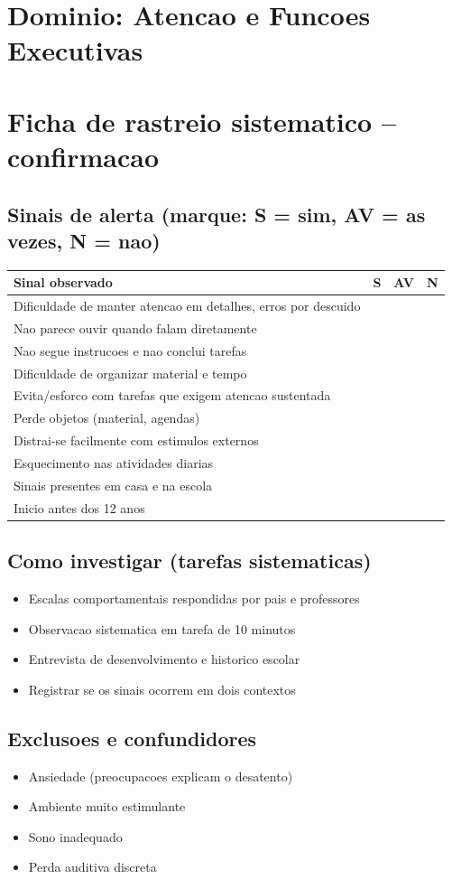 \documentclass[a4paper,11pt]{book}
\begin{document}
\section*{Dominio: Atencao e Funcoes Executivas}
\section*{Ficha de rastreio sistematico -- confirmacao}
\subsection*{Sinais de alerta (marque: S = sim, AV = as vezes, N = nao)}
\begin{tabular}{@{}p{11.5cm}ccc@{}}\toprule
Sinal observado & S & AV & N \\\midrule
Dificuldade de manter atencao em detalhes, erros por descuido & & & \\
Nao parece ouvir quando falam diretamente & & & \\
Nao segue instrucoes e nao conclui tarefas & & & \\
Dificuldade de organizar material e tempo & & & \\
Evita/esforco com tarefas que exigem atencao sustentada & & & \\
Perde objetos (material, agendas) & & & \\
Distrai-se facilmente com estimulos externos & & & \\
Esquecimento nas atividades diarias & & & \\
Sinais presentes em casa e na escola & & & \\
Inicio antes dos 12 anos & & & \\
\bottomrule\end{tabular}
\subsection*{Como investigar (tarefas sistematicas)}
\begin{itemize}
\item Escalas comportamentais respondidas por pais e professores
\item Observacao sistematica em tarefa de 10 minutos
\item Entrevista de desenvolvimento e historico escolar
\item Registrar se os sinais ocorrem em dois contextos
\end{itemize}
\subsection*{Exclusoes e confundidores}
\begin{itemize}
\item Ansiedade (preocupacoes explicam o desatento)
\item Ambiente muito estimulante
\item Sono inadequado
\item Perda auditiva discreta
\end{itemize}
\end{document}
